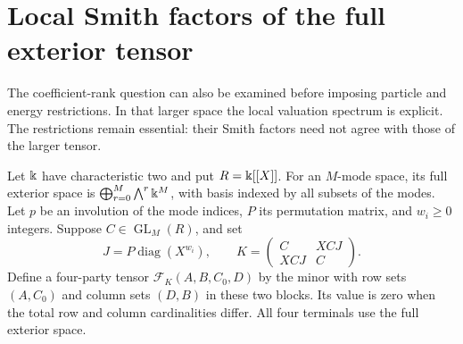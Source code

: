 \section{Local Smith factors of the full exterior tensor}
\label{sec:fock-smith}

The coefficient-rank question can also be examined before imposing
particle and energy restrictions. In that larger space the local
valuation spectrum is explicit. The restrictions remain essential:
their Smith factors need not agree with those of the larger tensor.

Let $\Bbbk$ have characteristic two and put $R=\Bbbk[[X]]$.
For an $M$-mode space, its full exterior space is
$\bigoplus_{r=0}^M\bigwedge^r\Bbbk^M$, with basis indexed by all
subsets of the modes. Let $p$ be an involution of the mode indices,
$P$ its permutation matrix, and $w_i\geq0$ integers. Suppose
$C\in\operatorname{GL}_M(R)$, and set
\[
 J=P\operatorname{diag}(X^{w_i}),\qquad
 K=\begin{pmatrix}C&XCJ\\XCJ&C\end{pmatrix}.
\]
Define a four-party tensor $\mathcal F_K(A,B,C_0,D)$ by the minor
with row sets $(A,C_0)$ and column sets $(D,B)$ in these two blocks.
Its value is zero when the total row and column cardinalities differ.
All four terminals use the full exterior space.

